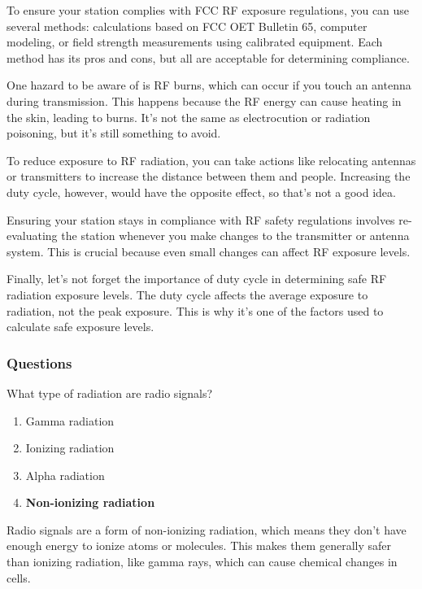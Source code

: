 To ensure your station complies with FCC RF exposure regulations, you can use several methods: calculations based on FCC OET Bulletin 65, computer modeling, or field strength measurements using calibrated equipment. Each method has its pros and cons, but all are acceptable for determining compliance.

One hazard to be aware of is RF burns, which can occur if you touch an antenna during transmission. This happens because the RF energy can cause heating in the skin, leading to burns. It's not the same as electrocution or radiation poisoning, but it's still something to avoid.

To reduce exposure to RF radiation, you can take actions like relocating antennas or transmitters to increase the distance between them and people. Increasing the duty cycle, however, would have the opposite effect, so that's not a good idea.

Ensuring your station stays in compliance with RF safety regulations involves re-evaluating the station whenever you make changes to the transmitter or antenna system. This is crucial because even small changes can affect RF exposure levels.

Finally, let's not forget the importance of duty cycle in determining safe RF radiation exposure levels. The duty cycle affects the average exposure to radiation, not the peak exposure. This is why it's one of the factors used to calculate safe exposure levels.

\subsubsection*{Questions}

\begin{tcolorbox}[colback=gray!10!white,colframe=black!75!black,title={T0C01}]
What type of radiation are radio signals?
\begin{enumerate}[label=\Alph*),noitemsep]
    \item Gamma radiation
    \item Ionizing radiation
    \item Alpha radiation
    \item \textbf{Non-ionizing radiation}
\end{enumerate}
\end{tcolorbox}
Radio signals are a form of non-ionizing radiation, which means they don't have enough energy to ionize atoms or molecules. This makes them generally safer than ionizing radiation, like gamma rays, which can cause chemical changes in cells.

